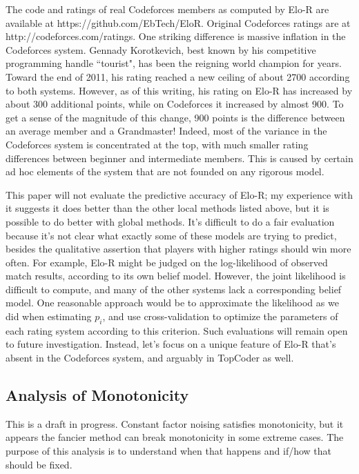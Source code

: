 \documentclass{article}
\begin{document}
The code and ratings of real Codeforces members as computed by Elo-R are available at https://github.com/EbTech/EloR. Original Codeforces ratings are at http://codeforces.com/ratings. One striking difference is massive inflation in the Codeforces system. Gennady Korotkevich, best known by his competitive programming handle ``tourist", has been the reigning world champion for years. Toward the end of 2011, his rating reached a new ceiling of about 2700 according to both systems. However, as of this writing, his rating on Elo-R has increased by about 300 additional points, while on Codeforces it increased by almost 900. To get a sense of the magnitude of this change, 900 points is the difference between an average member and a Grandmaster! Indeed, most of the variance in the Codeforces system is concentrated at the top, with much smaller rating differences between beginner and intermediate members. This is caused by certain ad hoc elements of the system that are not founded on any rigorous model.

This paper will not evaluate the predictive accuracy of Elo-R; my experience with it suggests it does better than the other local methods listed above, but it is possible to do better with global methods. It's difficult to do a fair evaluation because it's not clear what exactly some of these models are trying to predict, besides the qualitative assertion that players with higher ratings should win more often. For example, Elo-R might be judged on the log-likelihood of observed match results, according to its own belief model. However, the joint likelihood is difficult to compute, and many of the other systems lack a corresponding belief model. One reasonable approach would be to approximate the likelihood as we did when estimating $p_i$, and use cross-validation to optimize the parameters of each rating system according to this criterion. Such evaluations will remain open to future investigation. Instead, let's focus on a unique feature of Elo-R that's absent in the Codeforces system, and arguably in TopCoder as well.

\subsection{Analysis of Monotonicity}

This is a draft in progress. Constant factor noising satisfies monotonicity, but it appears the fancier method can break monotonicity in some extreme cases. The purpose of this analysis is to understand when that happens and if/how that should be fixed.
\end{document}

